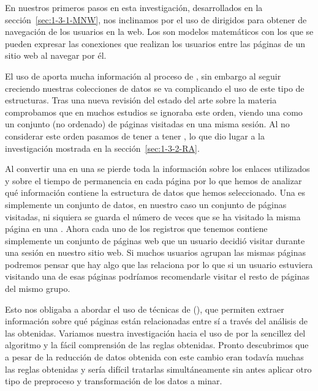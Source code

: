 En nuestros primeros pasos en esta investigación, desarrollados en la sección~\ref{sec:1-3-1-MNW}, nos inclinamos por el uso de \grafos dirigidos para obtener \patrones de navegación de los usuarios en la web. Los \grafos son modelos matemáticos con los que se pueden expresar las conexiones que realizan los usuarios entre las páginas de un sitio web al navegar por él.

El uso de \grafos aporta mucha información al proceso de \WUM, sin embargo al seguir creciendo nuestras colecciones de datos se va complicando el uso de este tipo de estructuras. Tras una nueva revisión del estado del arte sobre la materia comprobamos que en muchos estudios se ignoraba este orden, viendo una \sn como un conjunto (no ordenado) de páginas visitadas en una misma sesión. Al no considerar este orden pasamos de tener \secuencias a tener \transacciones, lo que dio lugar a la investigación mostrada en la sección~\ref{sec:1-3-2-RA}.

Al convertir una \sn en una \transaccion se pierde toda la información sobre los enlaces utilizados y sobre el tiempo de permanencia en cada página por lo que hemos de analizar qué información contiene la estructura de datos que hemos seleccionado. Una \transaccion es simplemente un conjunto de datos, en nuestro caso un conjunto de páginas visitadas, ni siquiera se guarda el número de veces que se ha visitado la misma página en una \sn. Ahora cada uno de los registros que tenemos contiene simplemente un conjunto de páginas web que un usuario decidió visitar durante una sesión en nuestro sitio web. Si muchos usuarios agrupan las mismas páginas podremos pensar que hay algo que las relaciona por lo que si un usuario estuviera visitando una de esas páginas podríamos recomendarle visitar el resto de páginas del mismo grupo.

Esto nos obligaba a abordar el uso de técnicas de \arm (\ARM), que permiten extraer información sobre qué páginas están relacionadas entre sí a través del análisis de las \transacciones obtenidas. Variamos nuestra investigación hacia el uso de \ARM por la sencillez del algoritmo \apriori y la fácil comprensión de las reglas obtenidas. Pronto descubrimos que a pesar de la reducción de datos obtenida con este cambio eran todavía muchas las reglas obtenidas y sería difícil tratarlas simultáneamente sin antes aplicar otro tipo de preproceso y transformación de los datos a minar.
